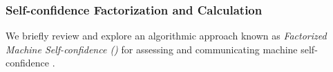 \subsubsection{Self-confidence Factorization and Calculation} \label{sec:self-confidence}

    We briefly review and explore an algorithmic approach known as \textit{Factorized Machine Self-confidence (\famsec{})} for assessing and communicating machine self-confidence \cite{Aitken2016-cv}. 
